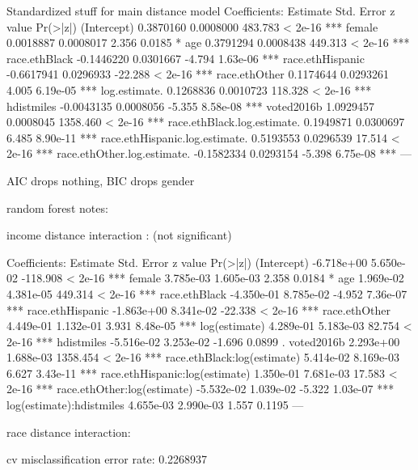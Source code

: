Standardized stuff for main distance model
Coefficients:
                                 Estimate Std. Error  z value Pr(>|z|)    
(Intercept)                     0.3870160  0.0008000  483.783  < 2e-16 ***
female                          0.0018887  0.0008017    2.356   0.0185 *  
age                             0.3791294  0.0008438  449.313  < 2e-16 ***
race.ethBlack                  -0.1446220  0.0301667   -4.794 1.63e-06 ***
race.ethHispanic               -0.6617941  0.0296933  -22.288  < 2e-16 ***
race.ethOther                   0.1174644  0.0293261    4.005 6.19e-05 ***
log.estimate.                   0.1268836  0.0010723  118.328  < 2e-16 ***
hdistmiles                     -0.0043135  0.0008056   -5.355 8.58e-08 ***
voted2016b                      1.0929457  0.0008045 1358.460  < 2e-16 ***
race.ethBlack.log.estimate.     0.1949871  0.0300697    6.485 8.90e-11 ***
race.ethHispanic.log.estimate.  0.5193553  0.0296539   17.514  < 2e-16 ***
race.ethOther.log.estimate.    -0.1582334  0.0293154   -5.398 6.75e-08 ***
---


AIC drops nothing, BIC drops gender

random forest notes:



income distance interaction : (not significant)

Coefficients:
                                 Estimate Std. Error  z value Pr(>|z|)    
(Intercept)                    -6.718e+00  5.650e-02 -118.908  < 2e-16 ***
female                          3.785e-03  1.605e-03    2.358   0.0184 *  
age                             1.969e-02  4.381e-05  449.314  < 2e-16 ***
race.ethBlack                  -4.350e-01  8.785e-02   -4.952 7.36e-07 ***
race.ethHispanic               -1.863e+00  8.341e-02  -22.338  < 2e-16 ***
race.ethOther                   4.449e-01  1.132e-01    3.931 8.48e-05 ***
log(estimate)                   4.289e-01  5.183e-03   82.754  < 2e-16 ***
hdistmiles                     -5.516e-02  3.253e-02   -1.696   0.0899 .  
voted2016b                      2.293e+00  1.688e-03 1358.454  < 2e-16 ***
race.ethBlack:log(estimate)     5.414e-02  8.169e-03    6.627 3.43e-11 ***
race.ethHispanic:log(estimate)  1.350e-01  7.681e-03   17.583  < 2e-16 ***
race.ethOther:log(estimate)    -5.532e-02  1.039e-02   -5.322 1.03e-07 ***
log(estimate):hdistmiles        4.655e-03  2.990e-03    1.557   0.1195    
---



race distance interaction: 

cv misclassification error rate: 0.2268937

